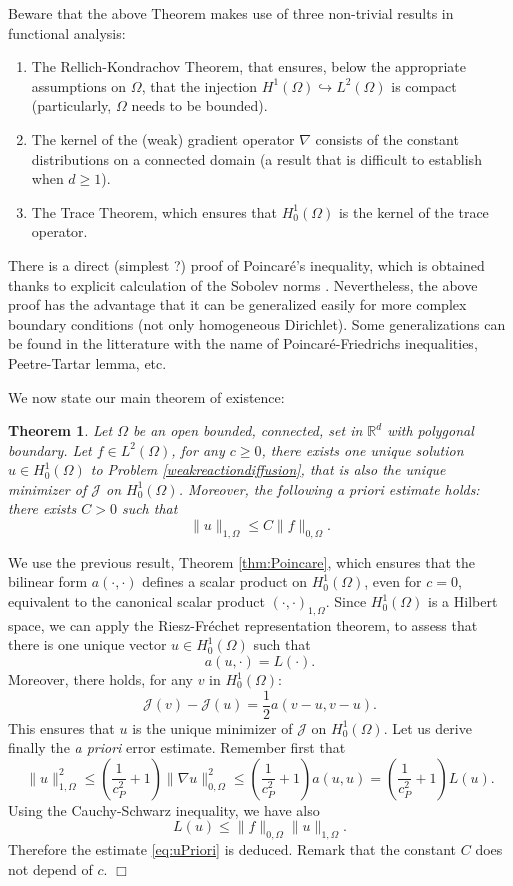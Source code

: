 \documentclass{article}
\newtheorem{theorem}{Theorem}
\begin{document}
Beware that the above Theorem makes use of three non-trivial results in functional analysis:
\begin{enumerate}
    \item The Rellich-Kondrachov Theorem, that ensures, below the appropriate assumptions on $\Omega$, that the injection $H^1(\Omega) \hookrightarrow L^2(\Omega)$ is compact (particularly, $\Omega$ needs to be bounded).
    \item The kernel of the (weak) gradient operator $\nabla$ consists of the constant distributions on a connected domain (a result that is difficult to establish when $d\geq1$).
    \item The Trace Theorem, which ensures that $H^1_0(\Omega)$ is the kernel of the trace operator.
\end{enumerate}
There is a direct (simplest ?) proof of Poincaré's inequality, which is obtained thanks to explicit calculation of the Sobolev norms \cite{raviart83,sayas19}. Nevertheless, the above proof has the advantage that it can be generalized easily for more complex boundary conditions (not only homogeneous Dirichlet). Some generalizations can be found in the litterature with the name of Poincaré-Friedrichs inequalities, Peetre-Tartar lemma, etc.

\medskip

We now state our main theorem of existence:
\begin{theorem} \label{thm:weak_existence}
Let $\Omega$ be an open bounded, connected, set in $\mathbb{R}^d$ with polygonal boundary. 
Let $f \in L^2(\Omega)$, for any $c\geq0$, there exists one unique solution $u\in H^1_0(\Omega)$ to Problem \eqref{weakreactiondiffusion}, that is also the unique minimizer of $\mathcal{J}$ on $H^1_0(\Omega)$. Moreover, the following \emph{a priori} estimate holds: there exists $C>0$ such that
\begin{equation}
    \label{eq:uPriori}
    \| u \|_{1,\Omega} \leq
    C \| f \|_{0,\Omega}.
\end{equation}
\end{theorem}

 We use the previous result, Theorem \ref{thm:Poincare}, which ensures that the bilinear form $a(\cdot,\cdot)$ defines a scalar product on $H^1_0(\Omega)$, even for $c=0$, equivalent to the canonical scalar product $(\cdot,\cdot)_{1,\Omega}$. Since $H^1_0(\Omega)$ is a Hilbert space, we can apply the Riesz-Fr\'echet representation theorem, to assess that there is one unique vector $u \in H^1_0(\Omega)$ such that
\[
a(u,\cdot) = L(\cdot).
\]
Moreover, there holds, for any $v$ in $H^1_0(\Omega)$:
\[
\mathcal{J}(v) - \mathcal{J}(u)
= \frac{1}{2} a ( v - u , v - u).
\]
This ensures that $u$ is the unique minimizer of $\mathcal{J}$ on $H^1_0(\Omega)$. Let us derive finally the \emph{a priori} error estimate. Remember first that
\[
\| u \|^2_{1,\Omega}
\leq
\left ( \frac{1}{c_P^2} + 1 \right ) \| \nabla u \|^2_{0,\Omega}
\leq 
\left ( \frac{1}{c_P^2} + 1 \right ) a(u,u)
=
\left ( \frac{1}{c_P^2} + 1 \right ) L(u).
\]
Using the Cauchy-Schwarz inequality, we have also
\[
L(u) \leq \| f \|_{0,\Omega} \| u \|_{1,\Omega}.
\]
Therefore the estimate \eqref{eq:uPriori} is deduced. Remark that the constant $C$ does not depend of $c$. $\Box$
\end{document}
